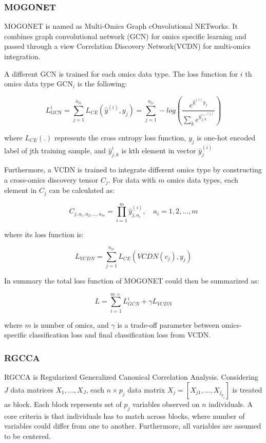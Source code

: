 \documentclass[
]{article}
\begin{document}
\hypertarget{mogonet}{%
\subsubsection{MOGONET}\label{mogonet}}

MOGONET is named as Multi-Omics Graph cOnvolutional NETworks. It combines graph convolutional network (GCN) for omics specific learning and passed through a view Correlation Discovery Network(VCDN) for multi-omics integration.

A different GCN is trained for each omics data type. The loss function for \(i\) th omics data type \(\text{GCN}_i\) is the following:

\[
L^{i}_{\text{GCN}} = \sum_{j=1}^{n_{tr}} L_{CE} (\hat{y}^{(i)}, y_j) = \sum_{j=1}^{n_{tr}} -log(\frac{e^{\hat{y}^{(i)}y_j}}{\sum_k e^{\hat{y_{j,k}}^{(i)}}} )
\]

where \(L_{CE}(.)\) represents the cross entropy loss function, \(y_j\) is one-hot encoded label of jth training sample, and \(\hat{y}^{i}_{j,k}\) is kth element in vector \(\hat{y}_j^{(i)}\)

Furthermore, a VCDN is trained to integrate different omics type by constructing a cross-omics discovery tensor \(C_j\). For data with \(m\) omics data types, each element in \(C_j\) can be calculated as:

\[
C_{j,a_1, a_2, \dots, a_m} = \prod_{i=1}^m \hat{y}^{(i)}_{j, a_i} , \quad a_i = 1,2,\dots,m
\]

where its loss function is:

\[
L_{VCDN} = \sum_{j=1}^{n_{tr}} L_{CE} (VCDN (c_j), y_j)
\]

In summary the total loss function of MOGONET could then be summarized as:

\[
L = \sum_{i=1}^{m=} L_{GCN}^{i} + \gamma L_{VCDN}
\]

where \(m\) is number of omics, and \(\gamma\) is a trade-off parameter between omics-specific classification loss and final classification loss from VCDN.

\hypertarget{rgcca}{%
\subsubsection{RGCCA}\label{rgcca}}

RGCCA is Regularized Generalized Canonical Correlation Analysis. Considering \(J\) data matrices \(X_1, \dots, X_J\), each \(n \times p_j\) data matrix \(X_j=[X_{j1}, \dots, X_{j_{p_j}}]\) is treated as block. Each block represents set of \(p_j\) variables observed on \(n\) individuals. A core criteria is that individuals has to match across blocks, where number of variables could differ from one to another. Furthermore, all variables are assumed to be centered.
\end{document}
